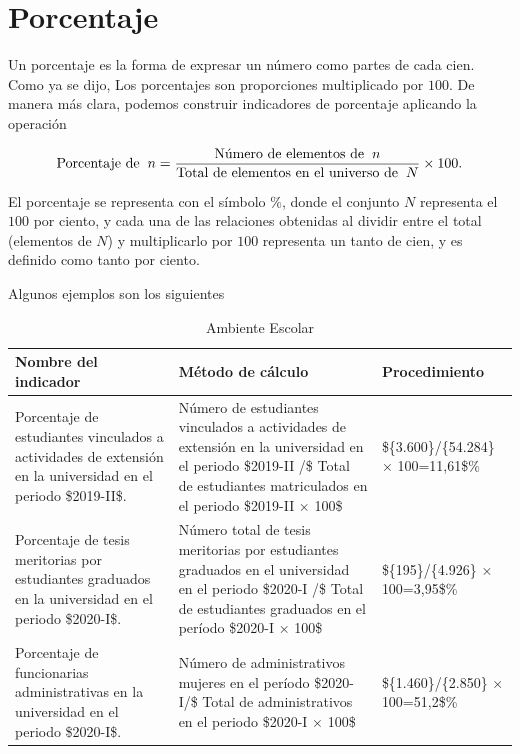 \documentclass[
]{book}
\begin{document}
\hypertarget{porcentaje}{%
\chapter{Porcentaje}\label{porcentaje}}

Un porcentaje es la forma de expresar un número como partes de cada cien. Como ya se dijo, Los porcentajes son proporciones multiplicado por \(100\). De manera más clara, podemos construir indicadores de porcentaje aplicando la operación

\[\begin{equation}
\text{Porcentaje de}\hspace{2mm}n=\frac{\text{Número de elementos de}\hspace{2mm}n}{\text{Total de elementos en el universo de}\hspace{2mm} N}\times 100.
\end{equation}\]

El porcentaje se representa con el símbolo \(\%\), donde el conjunto \(N\) representa el \(100\) por ciento, y cada una de las relaciones obtenidas al dividir entre el total (elementos de \(N\)) y multiplicarlo por \(100\) representa un tanto de cien, y es definido como tanto por ciento.

Algunos ejemplos son los siguientes

\begin{table}

\caption{\label{tab:unnamed-chunk-5}Ambiente Escolar}
\centering
\begin{tabular}[t]{l|l|l}
\hline
Nombre del indicador & Método de cálculo & Procedimiento\\
\hline
Porcentaje de estudiantes vinculados a actividades de extensión en la universidad en el periodo \$2019-II\$. & Número de estudiantes vinculados a actividades de extensión en la universidad en el periodo \$2019-II /\$ Total de estudiantes matriculados en el periodo \$2019-II × 100\$ & \$\{3.600\}/\{54.284\} × 100=11,61\$\%\\
\hline
Porcentaje de tesis meritorias por estudiantes graduados en la universidad en el periodo \$2020-I\$. & Número total de tesis meritorias por estudiantes graduados en el universidad en el periodo \$2020-I /\$ Total de estudiantes graduados en el período \$2020-I × 100\$ & \$\{195\}/\{4.926\} × 100=3,95\$\%\\
\hline
Porcentaje de funcionarias administrativas en la universidad en el periodo \$2020-I\$. & Número de administrativos mujeres en el período \$2020-I/\$ Total de administrativos en el periodo \$2020-I × 100\$ & \$\{1.460\}/\{2.850\} × 100=51,2\$\%\\
\hline
\end{tabular}
\end{table}
\end{document}
